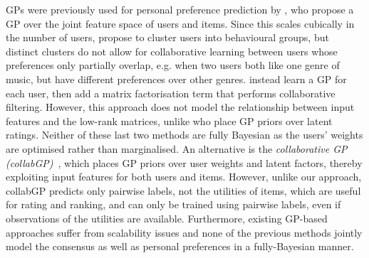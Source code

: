 GPs were previously used 
for personal preference prediction
by \citet{guo2010gaussian}, who propose a GP over the joint feature 
space of users and items. Since this scales cubically
in the number of users, \citet{abbasnejad2013learning} 
propose to cluster users into behavioural groups,
but distinct clusters do not
allow for collaborative learning between users whose preferences only partially overlap, 
e.g. when two users both like one genre of music, 
but have different preferences over other genres. 
\citet{khan2014scalable} instead learn a GP for each user,
then add a matrix factorisation term that performs collaborative filtering.
However, this approach does not model the relationship between
 input features and the low-rank matrices,
 unlike \citet{lawrence2009non} who place GP priors over latent ratings.
 Neither of these last two methods
 are fully Bayesian as the users' weights
 are optimised rather than marginalised.
An alternative is the \emph{collaborative GP (collabGP)}~\citep{houlsby2012collaborative},
which places GP priors over user weights and latent factors,
thereby exploiting input features for both users and items. 
However, unlike our approach, collabGP predicts only pairwise labels, not 
the utilities of items, which are useful for rating and ranking,
and can only be trained using pairwise labels, even if observations of the utilities
are available.
Furthermore, existing GP-based approaches
suffer from scalability issues and 
none of the previous methods jointly model the consensus as well as personal preferences
in a fully-Bayesian manner.



